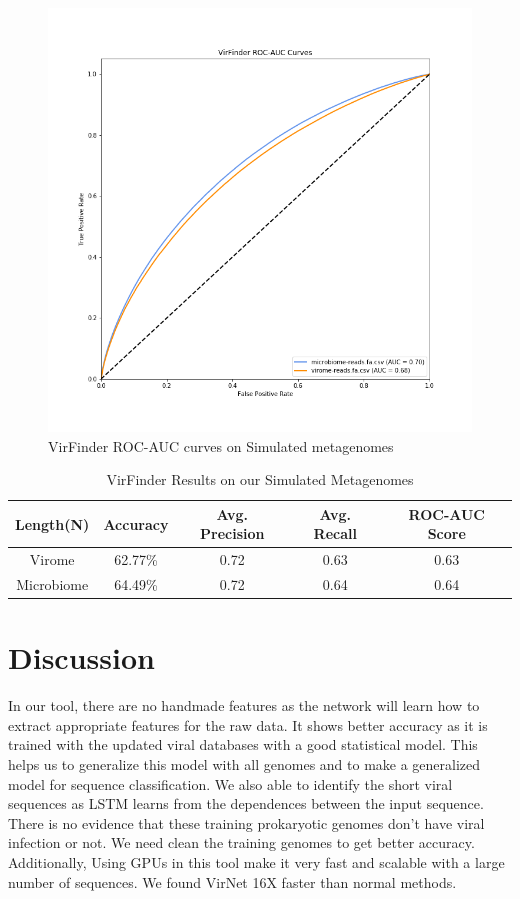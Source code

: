 \documentclass[conference]{IEEEtran}
\begin{document}
\begin{figure}
	\centering
	\includegraphics[width=\columnwidth]{imgs/roc_auc_simulated.png}
	\caption{VirFinder ROC-AUC curves on Simulated metagenomes}
	\label{fig:roc_auc_virfinder_simulated}
\end{figure}



\begin{table}[h!]
	\centering
	\begin{tabular}{||c c c c c||} 
		Length(N) &	Accuracy & Avg. Precision & Avg. Recall &	ROC-AUC Score \\ [0.5ex] 
		\hline\hline
		Virome &	62.77\%	& 0.72 & 0.63 & 0.63 \\
		Microbiome &	64.49\% &	0.72 & 0.64 & 0.64 \\ [1ex]
	\end{tabular}
	\caption{VirFinder Results on our Simulated Metagenomes}
	\label{table:virfinder_results_simulated}
\end{table}

\section{Discussion}

In our tool, there are no handmade features as the network will learn how to extract appropriate features for the raw data. It shows better accuracy as it is trained with the updated viral databases with a good statistical model. This helps us to generalize this model with all genomes and to make a generalized model for sequence classification. We also able to identify the short viral sequences as LSTM learns from the dependences between the input sequence. 
There is no evidence that these training prokaryotic genomes don't have viral infection or not. We need clean the training genomes to get better accuracy. Additionally, Using GPUs in this tool make it very fast and scalable with a large number of sequences. We found VirNet 16X faster than normal methods. 
\end{document}
